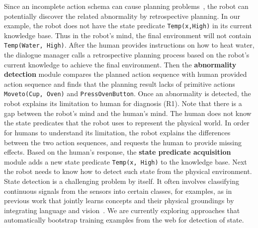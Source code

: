\documentclass[letterpaper]{article} %
\begin{document}
Since an incomplete action schema can cause planning problems~\cite{gil1994learning}, the robot can potentially discover the related abnormality by retrospective planning. In our example, the robot does not have the state predicate \texttt{Temp(x,High)} in its current knowledge base. Thus in the robot's mind, the final environment will not contain \texttt{Temp(Water, High)}. After the human provides instructions on how to heat water, the dialogue manager calls a retrospective planning process based on the robot's current knowledge to achieve the final environment. Then the {\bf abnormality detection} module compares the planned action sequence with human provided action sequence and finds that the planning result lacks of primitive actions \texttt{Moveto(Cup, Oven)} and  \texttt{PressOvenButton}. Once an abnormality is detected, the robot explains its limitation to human for diagnosis (R1). Note that there is a gap between the robot's mind and the human's mind. The human does not know the state predicates that the robot uses to represent the physical world. In order for humans to understand its limitation, the robot explains the differences between the two action sequences, and requests the human to provide missing effects. Based on the human's response, the {\bf state predicate acquisition} module adds a new state predicate \texttt{Temp(x, High)} to the knowledge base.
Next the robot needs to know how to detect such state from the physical environment. State detection is a challenging problem by itself. It often involves classifying continuous signals from the sensors into certain classes, for examples, as in previous work that jointly learns concepts and their physical groundings by integrating language and vision~\cite{matuszek2012joint,krishnamurthy2013jointly}. We are currently exploring approaches that automatically bootstrap training examples from the web for detection of state. 


\end{document}

